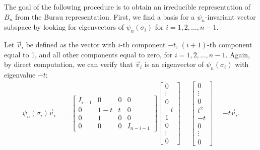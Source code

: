 
The goal of the following procedure is to obtain an irreducible representation of $B_n$ from the Burau representation. First, we find a basis for a $\psi_n$-invariant vector subspace by looking for eigenvectors of $\psi_n(\sigma_i)$ for $i=1,2,\dots,n-1$.

Let $\vec{v}_i$ be defined as the vector with $i$-th component $-t$, $(i+1)$-th component equal to 1, and all other components equal to zero, for $i=1,2,\dots,n-1$. Again, by direct computation, we can verify that $\vec{v}_i$ is an eigenvector of $\psi_n(\sigma_i)$ with eigenvalue $-t$:
\begin{align}
    \psi_n(\sigma_i)\vec{v}_i &= \begin{bmatrix}
        I_{i-1} & 0 & 0 & 0 \\
        0 & 1-t & t & 0 \\
        0 & 1 & 0 & 0 \\
        0 & 0 & 0 & I_{n-i-1}
    \end{bmatrix}\begin{bmatrix}
        0 \\ \vdots \\ 0 \\ -t \\ 1 \\ 0 \\ \vdots \\ 0
    \end{bmatrix} = \begin{bmatrix}
        0 \\ \vdots \\ 0 \\ t^2 \\ -t \\ 0 \\ \vdots \\ 0
    \end{bmatrix} = -t\vec{v}_i.
\end{align}

